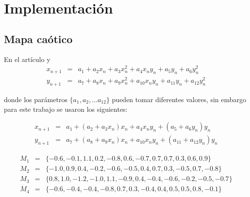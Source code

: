 \chapter{Implementación}

	\section{Mapa caótico}
    
        En el artículo \cite{Sprott1993} y \cite{Fraga2021}
        \begin{equation}
            \begin{array}{ccl}
                x_{n+1} & = &  a_{1} + a_{2}x_{n} + a_{3}x_{n}^{2} + a_{4}x_{n}y_{n} + a_{5}y_{n} + a_{6}y_{n}^{2}\\
                y_{n+1} & = &  a_{7} + a_{8}x_{n} + a_{9}x_{n}^{2} + a_{10}x_{n}y_{n} + a_{11}y_{n} + a_{12}y_{n}^{2}
            \end{array}
        \end{equation}
        
        donde los parámetros $\{a_{1}, a_{2}, \ldots a_{12}\}$ pueden tomar diferentes valores, sin embargo para este trabajo se usaron los siguientes:


        \begin{equation}
            \begin{array}{ccl}
                x_{n+1} & = &  a_{1} + ( a_{2} + a_{3}x_{n} )x_{n} + a_{4}x_{n}y_{n} + ( a_{5} + a_{6}y_{n} )y_{n} \\
                y_{n+1} & = &  a_{7} + ( a_{8} + a_{9}x_{n} )x_{n} + a_{10}x_{n}y_{n} + ( a_{11} + a_{12}y_{n})y_{n}
            \end{array}
        \end{equation}

        \begin{equation}
             \begin{array}{lcl}
                M_{1} & = & \{ -0.6, -0.1, 1.1, 0.2, -0.8, 0.6, -0.7, 0.7, 0.7, 0.3, 0.6, 0.9 \}\\
                M_{2} & = & \{ -1.0, 0.9, 0.4, -0.2, -0.6, -0.5, 0.4, 0.7, 0.3, -0.5, 0.7, -0.8 \}\\
                M_{3} & = &  \{0.8, 1.0, -1.2, -1.0, 1.1, -0.9, 0.4, -0.4, -0.6, -0.2, -0.5, -0.7 \}\\
                M_{4} & = & \{-0.6, -0.4, -0.4, -0.8, 0.7, 0.3, -0.4, 0.4, 0.5, 0.5, 0.8, -0.1 \}
            \end{array}
        \end{equation}

